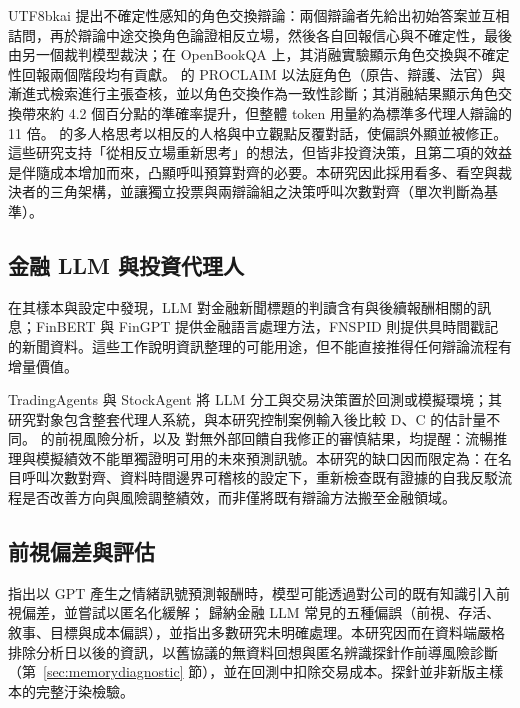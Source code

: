 \documentclass[12pt,a4paper]{article}
\newcommand{\grp}[1]{\textsf{#1}}
\begin{document}
\begin{CJK}{UTF8}{bkai}
\citet{liu2025roleswitch} 提出不確定性感知的角色交換辯論：兩個辯論者先給出初始答案並互相詰問，再於辯論中途交換角色論證相反立場，然後各自回報信心與不確定性，最後由另一個裁判模型裁決；在 OpenBookQA 上，其消融實驗顯示角色交換與不確定性回報兩個階段均有貢獻。\citet{chowdhury2026proclaim} 的 PROCLAIM 以法庭角色（原告、辯護、法官）與漸進式檢索進行主張查核，並以角色交換作為一致性診斷；其消融結果顯示角色交換帶來約 4.2 個百分點的準確率提升，但整體 token 用量約為標準多代理人辯論的 11 倍。\citet{chen2026mpt} 的多人格思考以相反的人格與中立觀點反覆對話，使偏誤外顯並被修正。這些研究支持「從相反立場重新思考」的想法，但皆非投資決策，且第二項的效益是伴隨成本增加而來，凸顯呼叫預算對齊的必要。本研究因此採用看多、看空與裁決者的三角架構，並讓獨立投票與兩辯論組之決策呼叫次數對齊（單次判斷為基準）。

\subsection{金融 LLM 與投資代理人}

\citet{lopezlira2023chatgpt} 在其樣本與設定中發現，LLM 對金融新聞標題的判讀含有與後續報酬相關的訊息；FinBERT \citep{araci2019finbert} 與 FinGPT \citep{liu2023fingpt} 提供金融語言處理方法，FNSPID \citep{dong2024fnspid} 則提供具時間戳記的新聞資料。這些工作說明資訊整理的可能用途，但不能直接推得任何辯論流程有增量價值。

TradingAgents \citep{xiao2024tradingagents} 與 StockAgent \citep{zhang2024stockagent} 將 LLM 分工與交易決策置於回測或模擬環境；其研究對象包含整套代理人系統，與本研究控制案例輸入後比較 \grp{D}、\grp{C} 的估計量不同。\citet{glasserman2023lookahead} 的前視風險分析，以及 \citet{huang2024selfcorrect} 對無外部回饋自我修正的審慎結果，均提醒：流暢推理與模擬績效不能單獨證明可用的未來預測訊號。本研究的缺口因而限定為：在名目呼叫次數對齊、資料時間邊界可稽核的設定下，重新檢查既有證據的自我反駁流程是否改善方向與風險調整績效，而非僅將既有辯論方法搬至金融領域。

\subsection{前視偏差與評估}

\citet{glasserman2023lookahead} 指出以 GPT 產生之情緒訊號預測報酬時，模型可能透過對公司的既有知識引入前視偏差，並嘗試以匿名化緩解；\citet{kong2026bias} 歸納金融 LLM 常見的五種偏誤（前視、存活、敘事、目標與成本偏誤），並指出多數研究未明確處理。本研究因而在資料端嚴格排除分析日以後的資訊，以舊協議的無資料回想與匿名辨識探針作前導風險診斷（第~\ref{sec:memorydiagnostic} 節），並在回測中扣除交易成本。探針並非新版主樣本的完整汙染檢驗。


\end{CJK}
\end{document}
